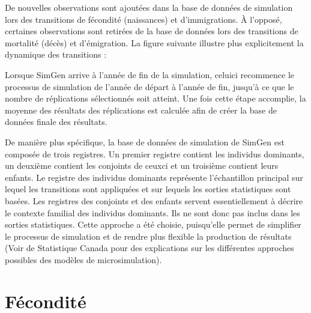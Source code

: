 \documentclass[letterpaper,10pt,french]{sphinxmanual}
\begin{document}
De nouvelles observations sont ajoutées dans la base de données de simulation
lors des transitions de fécondité (naissances) et d’immigrations. À l’opposé,
certaines observations sont retirées de la base de données lors des transitions de mortalité (décès) et
d’émigration. La figure suivante illustre plus explicitement la dynamique des transitions :

\begin{figure}[htbp]
\centering

\noindent{}
\end{figure}

Lorsque SimGen arrive à l’année de fin de la simulation, celui\sphinxhyphen{}ci recommence le processus de simulation
de l’année de départ à l’année de fin, jusqu’à ce que le nombre de réplications sélectionnés soit atteint.
Une fois cette étape accomplie, la moyenne des résultats des réplications est calculée afin de créer
la base de données finale des résultats.


De manière plus spécifique, la base de données de simulation de SimGen est composée de trois registres. Un premier registre contient les individus dominants, un deuxième contient les conjoints de ceux\sphinxhyphen{}ci et
un troisième contient leurs enfants. Le registre des individus dominants représente l’échantillon principal sur lequel les transitions sont appliquées et sur lequels les sorties statistiques sont basées.
Les registres des conjoints et des enfants servent essentiellement à décrire le contexte familial des individus dominants. Ils ne sont donc pas inclus dans les sorties statistiques.
Cette approche a été choisie, puisqu’elle permet de simplifier le processus de simulation et de rendre plus flexible la production de résultats
(Voir  de Statistique Canada
pour des explications sur les différentes approches possibles des modèles de microsimulation).


\section{Fécondité}
\label{\detokenize{methodologie:fecondite}}
\end{document}
